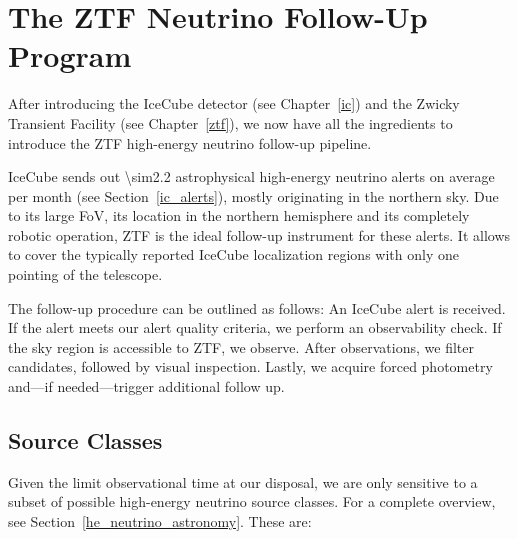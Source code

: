 \chapter{The ZTF Neutrino Follow-Up Program}\label{fupipeline}
After introducing the IceCube detector (see Chapter~\ref{ic}) and the Zwicky Transient Facility (see Chapter~\ref{ztf}), we now have all the ingredients to introduce the ZTF high-energy neutrino follow-up pipeline.

IceCube sends out \num{\sim2.2} astrophysical high-energy neutrino alerts on average per month (see Section~\ref{ic_alerts}), mostly originating in the northern sky. Due to its large FoV, its location in the northern hemisphere and its completely robotic operation, ZTF is the ideal follow-up instrument for these alerts. It allows to cover the typically reported IceCube localization regions with only one pointing of the telescope.

The follow-up procedure can be outlined as follows: An IceCube alert is received. If the alert meets our alert quality criteria, we perform an observability check. If the sky region is accessible to ZTF, we observe. After observations, we filter candidates, followed by visual inspection. Lastly, we acquire forced photometry and---if needed---trigger additional follow up.

\section{Source Classes}
Given the limit observational time at our disposal, we are only sensitive to a subset of possible high-energy neutrino source classes. For a complete overview, see Section~\ref{he_neutrino_astronomy}. These are:

